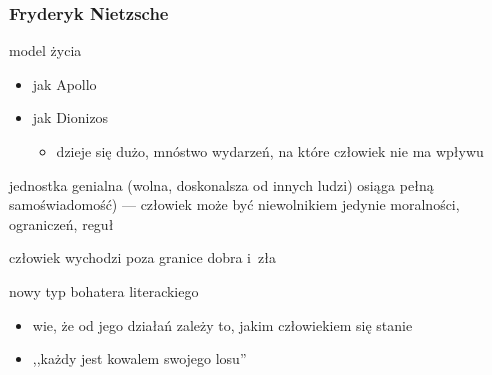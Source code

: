 \subsubsection*{Fryderyk Nietzsche}
\begin{description}
    \item model życia
        \begin{itemize}
            \item jak Apollo
            \item jak Dionizos
                \begin{itemize}
                    \item dzieje się dużo, mnóstwo wydarzeń, na które człowiek nie ma wpływu
                \end{itemize}
        \end{itemize}
    \item jednostka genialna (wolna, doskonalsza od innych ludzi) osiąga pełną samoświadomość) --- człowiek może być niewolnikiem jedynie moralności, ograniczeń, reguł
    \item człowiek wychodzi poza granice dobra i~zła
    \item nowy typ bohatera literackiego
        \begin{itemize}
            \item wie, że od jego działań zależy to, jakim człowiekiem się stanie
            \item ,,każdy jest kowalem swojego losu''
        \end{itemize}
\end{description}
